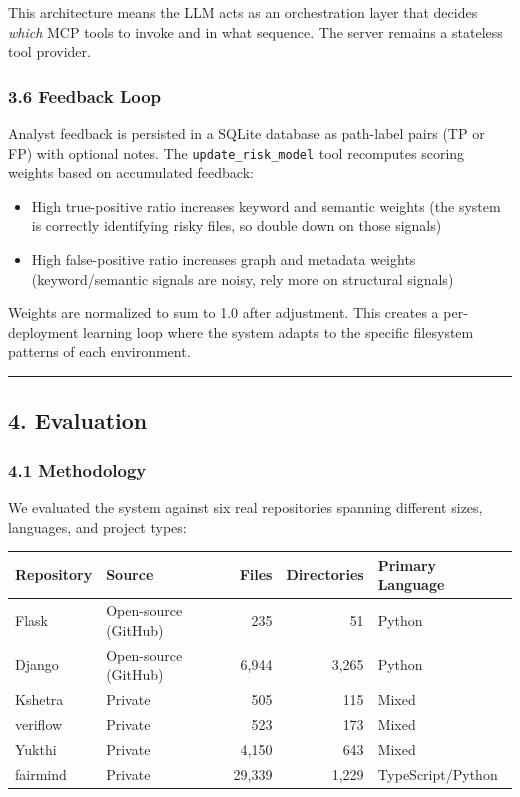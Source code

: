 \documentclass[
]{article}
\newcounter{none} %
\providecommand{\tightlist}{%
  \setlength{\itemsep}{0pt}\setlength{\parskip}{0pt}}
\begin{document}
This architecture means the LLM acts as an orchestration layer that
decides \emph{which} MCP tools to invoke and in what sequence. The
server remains a stateless tool provider.

\subsubsection{3.6 Feedback Loop}\label{feedback-loop}

Analyst feedback is persisted in a SQLite database as path-label pairs
(TP or FP) with optional notes. The \texttt{update\_risk\_model} tool
recomputes scoring weights based on accumulated feedback:

\begin{itemize}
\tightlist
\item
  High true-positive ratio increases keyword and semantic weights (the
  system is correctly identifying risky files, so double down on those
  signals)
\item
  High false-positive ratio increases graph and metadata weights
  (keyword/semantic signals are noisy, rely more on structural signals)
\end{itemize}

Weights are normalized to sum to 1.0 after adjustment. This creates a
per-deployment learning loop where the system adapts to the specific
filesystem patterns of each environment.

\begin{center}\rule{0.5\linewidth}{0.5pt}\end{center}

\subsection{4. Evaluation}\label{evaluation}

\subsubsection{4.1 Methodology}\label{methodology}

We evaluated the system against six real repositories spanning different
sizes, languages, and project types:

{\def\LTcaptype{none} %
\begin{longtable}[]{@{}llrrl@{}}
\toprule\noalign{}
Repository & Source & Files & Directories & Primary Language \\
\midrule\noalign{}
\endhead
\bottomrule\noalign{}
\endlastfoot
Flask & Open-source (GitHub) & 235 & 51 & Python \\
Django & Open-source (GitHub) & 6,944 & 3,265 & Python \\
Kshetra & Private & 505 & 115 & Mixed \\
veriflow & Private & 523 & 173 & Mixed \\
Yukthi & Private & 4,150 & 643 & Mixed \\
fairmind & Private & 29,339 & 1,229 & TypeScript/Python \\
\end{longtable}
}
\end{document}
